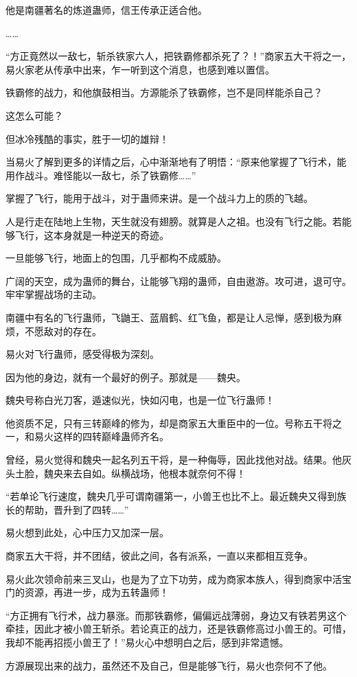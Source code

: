 \begin{this_body}
他是南疆著名的炼道蛊师，信王传承正适合他。

……

“方正竟然以一敌七，斩杀铁家六人，把铁霸修都杀死了？！”商家五大干将之一，易火家老从传承中出来，乍一听到这个消息，也感到难以置信。

铁霸修的战力，和他旗鼓相当。方源能杀了铁霸修，岂不是同样能杀自己？

这怎么可能？

但冰冷残酷的事实，胜于一切的雄辩！

当易火了解到更多的详情之后，心中渐渐地有了明悟：“原来他掌握了飞行术，能用作战斗。难怪能以一敌七，杀了铁霸修……”

掌握了飞行，能用于战斗，对于蛊师来讲。是一个战斗力上的质的飞越。

人是行走在陆地上生物，天生就没有翅膀。就算是人之祖。也没有飞行之能。若能够飞行，这本身就是一种逆天的奇迹。

一旦能够飞行，地面上的包围，几乎都构不成威胁。

广阔的天空，成为蛊师的舞台，让能够飞翔的蛊师，自由遨游。攻可进，退可守。牢牢掌握战场的主动。

南疆中有名的飞行蛊师，飞鼬王、蓝眉鹤、红飞鱼，都是让人忌惮，感到极为麻烦，不愿敌对的存在。

易火对飞行蛊师，感受得极为深刻。

因为他的身边，就有一个最好的例子。那就是——魏央。

魏央号称白光刀客，遁速似光，快如闪电，也是一位飞行蛊师！

他资质不足，只有三转巅峰的修为，却是商家五大重臣中的一位。号称五干将之一，和易火这样的四转巅峰蛊师齐名。

曾经，易火觉得和魏央一起名列五干将，是一种侮辱，因此找他对战。结果。他灰头土脸，魏央来去自如。纵横战场，他根本就奈何不得！

“若单论飞行速度，魏央几乎可谓南疆第一，小兽王也比不上。最近魏央又得到族长的帮助，晋升到了四转……”

易火想到此处，心中压力又加深一层。

商家五大干将，并不团结，彼此之间，各有派系，一直以来都相互竞争。

易火此次领命前来三叉山，也是为了立下功劳，成为商家本族人，得到商家中活宝门的资源，再进一步，成为五转蛊师！

“方正拥有飞行术，战力暴涨。而那铁霸修，偏偏远战薄弱，身边又有铁若男这个牵挂，因此才被小兽王斩杀。若论真正的战力，还是铁霸修高过小兽王的。可惜，我却不能再招揽小兽王了！”易火心中想明白之后，感到非常遗憾。

方源展现出来的战力，虽然还不及自己，但是能够飞行，易火也奈何不了他。


\end{this_body}

